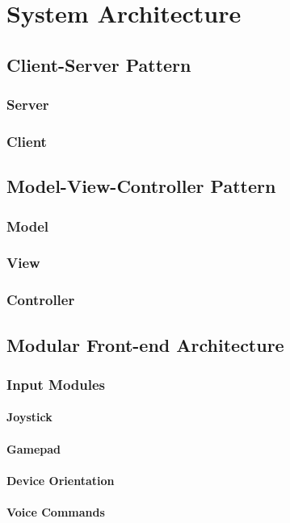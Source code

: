 \chapter{System Architecture}
\lipsum
\section{Client-Server Pattern}
\subsection{Server}
\subsection{Client}
\section{Model-View-Controller Pattern}
\subsection{Model}
\subsection{View}
\subsection{Controller}
\section{Modular Front-end Architecture}
\subsection{Input Modules}
\subsubsection{Joystick}
\subsubsection{Gamepad}
\subsubsection{Device Orientation}
\subsubsection{Voice Commands}
